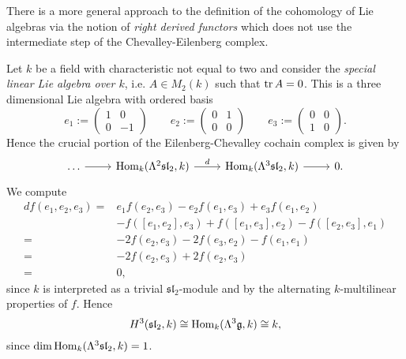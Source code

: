 \begin{remark}
	There is a more general approach to the definition of the cohomology of Lie algebras via the notion of \emph{right derived functors} which does not use the intermediate step of the Chevalley-Eilenberg complex. 
\end{remark}

\begin{example}[$H^3(\mathfrak{sl}_2,k)$]
	\label{ex:H^3_sl_2_k}
	Let $k$ be a field with characteristic not equal to two and consider the \emph{special linear Lie algebra over $k$}, i.e. $A \in M_2(k)$ such that $\operatorname{tr} A = 0$. This is a three dimensional Lie algebra with ordered basis 	
	\begin{equation*}
		e_1 := \begin{pmatrix}
			1 & 0\\
			0 & -1
		\end{pmatrix} \qquad
		e_2 := \begin{pmatrix}
			0 & 1\\
			0 & 0
		\end{pmatrix} \qquad
		e_3 := \begin{pmatrix}
			0 & 0\\
			1 & 0
		\end{pmatrix}.
	\end{equation*}
	Hence the crucial portion of the Eilenberg-Chevalley cochain complex is given by
	\begin{equation*}
		\begin{tikzcd}
			\dots \arrow[r] & \Hom_k(\Lambda^2\mathfrak{sl}_2,k) \arrow[r,"d"] & \Hom_k(\Lambda^3\mathfrak{sl}_2,k) \arrow[r] & 0.
		\end{tikzcd}
	\end{equation*}
	We compute
	\begin{align*}
		df(e_1,e_2,e_3) =& e_1f(e_2,e_3) - e_2f(e_1,e_3) + e_3f(e_1,e_2)\\
		&- f([e_1,e_2],e_3) + f([e_1,e_3],e_2) - f([e_2,e_3],e_1)\\
		=& -2f(e_2,e_3) - 2f(e_3,e_2) - f(e_1,e_1)\\
		=& -2f(e_2,e_3) + 2f(e_2,e_3)\\
		=& 0,
	\end{align*}
	\noindent since $k$ is interpreted as a trivial $\mathfrak{sl}_2$-module and by the alternating $k$-multilinear properties of $f$. Hence
	\begin{equation*}
		H^3(\mathfrak{sl}_2,k) \cong \operatorname{Hom}_k(\Lambda^3 \mathfrak{g},k) \cong k,
	\end{equation*}
	\noindent since $\dim \operatorname{Hom}_k(\Lambda^3\mathfrak{sl}_2,k) = 1$.
\end{example}

